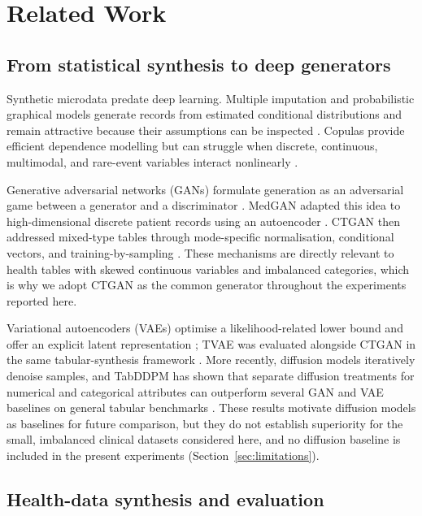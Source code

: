\section{Related Work}
\label{sec:related-work}

\subsection{From statistical synthesis to deep generators}

Synthetic microdata predate deep learning. Multiple imputation and probabilistic graphical models generate records from estimated conditional distributions and remain attractive because their assumptions can be inspected \citep{raghunathan2003}. Copulas provide efficient dependence modelling but can struggle when discrete, continuous, multimodal, and rare-event variables interact nonlinearly \citep{wang2021}.

Generative adversarial networks (GANs) formulate generation as an adversarial game between a generator and a discriminator \citep{goodfellow2014}. MedGAN adapted this idea to high-dimensional discrete patient records using an autoencoder \citep{choi2017}. CTGAN then addressed mixed-type tables through mode-specific normalisation, conditional vectors, and training-by-sampling \citep{xu2019}. These mechanisms are directly relevant to health tables with skewed continuous variables and imbalanced categories, which is why we adopt CTGAN as the common generator throughout the experiments reported here.

Variational autoencoders (VAEs) optimise a likelihood-related lower bound and offer an explicit latent representation \citep{kingma2014}; TVAE was evaluated alongside CTGAN in the same tabular-synthesis framework \citep{xu2019}. More recently, diffusion models iteratively denoise samples, and TabDDPM has shown that separate diffusion treatments for numerical and categorical attributes can outperform several GAN and VAE baselines on general tabular benchmarks \citep{kotelnikov2023}. These results motivate diffusion models as baselines for future comparison, but they do not establish superiority for the small, imbalanced clinical datasets considered here, and no diffusion baseline is included in the present experiments (Section~\ref{sec:limitations}).

\subsection{Health-data synthesis and evaluation}

